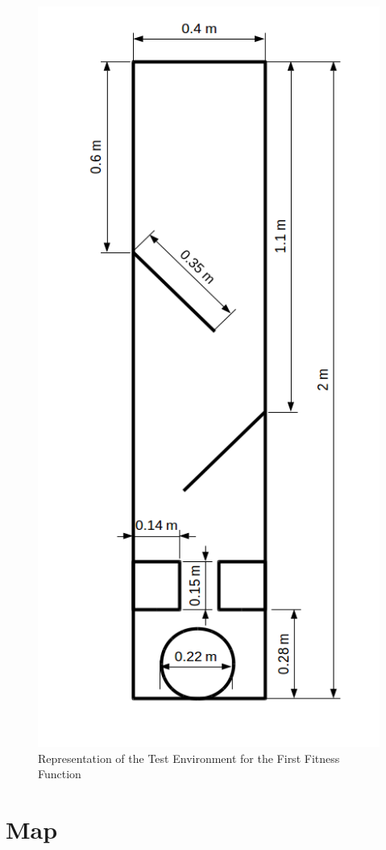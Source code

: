 \begin{figure}[h]
\centering
\includegraphics[scale=0.6]{Chapter3/images/first_fitness_environment.png}
\caption{Representation of the Test Environment for the First Fitness Function}
\label{appendixb:first_fitness}
\end{figure}

\section{Map}

